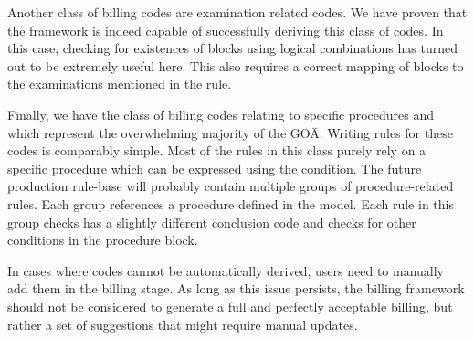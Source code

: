 Another class of billing codes are examination related codes.
We have proven that the framework is indeed capable of successfully deriving this class of codes.
In this case, checking for existences of blocks using logical combinations has turned out to be extremely useful here.
This also requires a correct mapping of blocks to the examinations mentioned in the rule.

Finally, we have the class of billing codes relating to specific procedures and which represent the overwhelming majority of the GOÄ.
Writing rules for these codes is comparably simple.
Most of the rules in this class purely rely on a specific procedure which can be expressed using the \requiredProcedure condition.
The future production rule-base will probably contain multiple groups of procedure-related rules.
Each group references a procedure defined in the \AV model.
Each rule in this group checks has a slightly different conclusion code and checks for other conditions in the procedure block.


In cases where codes cannot be automatically derived, users need to manually add them in the billing stage.
As long as this issue persists, the billing framework should not be considered to generate a full and perfectly acceptable billing,
but rather a set of suggestions that might require manual updates.





